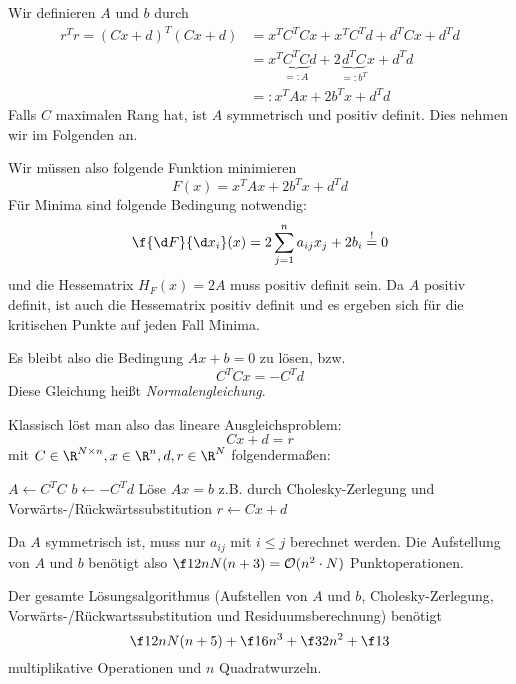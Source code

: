 \documentclass[a4paper]{scrartcl}
\numberwithin{equation}{section}
\begin{document}
Wir definieren $A$ und $b$ durch
\begin{align*}
	\label{eq:5.4}
	r^Tr = (Cx+d)^T(Cx+d) &= x^TC^TCx + x^TC^Td + d^TCx + d^Td \\
																					   &= x^T\underbrace{C^TC}_{=:A}d + 2\underbrace{d^TC}_{=:b^T}x + d^T d \\
						   &=: x^TAx + 2b^Tx +d^Td
\end{align*}
Falls $C$ maximalen Rang hat, ist $A$ symmetrisch und positiv definit.
Dies nehmen wir im Folgenden an.

Wir müssen also folgende Funktion minimieren
\begin{equation}
	\label{eq:5.5}
	F(x) = x^TAx + 2b^Tx + d^Td
\end{equation}
Für Minima sind folgende Bedingung notwendig:
\begin{equation}
	\label{eq:5.6}
	\f {\d F}{\d x_i}(x) = 2\sum_{j=1}^n a_{ij}x_j + 2b_i \stackrel != 0
\end{equation}
und die Hessematrix $H_F(x) = 2A$ muss positiv definit sein.
Da $A$ positiv definit, ist auch die Hessematrix positiv definit und es ergeben sich für die kritischen Punkte auf jeden Fall Minima.

Es bleibt also die Bedingung $Ax + b=0$ zu lösen, bzw.
\begin{equation}
	\label{eq:5.7}
	C^TCx = -C^Td
\end{equation}
Diese Gleichung heißt \emph{Normalengleichung}.

Klassisch löst man also das lineare Ausgleichsproblem:
\[
	Cx + d = r
\]
mit $C\in \R^{N\times n}, x\in \R^n, d,r\in \R^N$ folgendermaßen:

\begin{alg}
	\label{alg:5.1}
	
	\begin{algorithmic}
		\State $A \gets C^TC$
		\State $b \gets -C^Td$
		\State Löse $Ax=b$ z.B. durch Cholesky-Zerlegung und Vorwärts-/Rückwärtssubstitution
		\State $r \gets Cx+d$ 
	\end{algorithmic}

	Da $A$ symmetrisch ist, muss nur $a_{ij}$ mit $i\le j$ berechnet werden.
	Die Aufstellung von $A$ und $b$ benötigt also $\f12 nN(n+3) = \mathcal O(n^2\cdot N)$ Punktoperationen.
	
	Der gesamte Lösungsalgorithmus (Aufstellen von $A$ und $b$, Cholesky-Zerlegung, Vorwärts-/Rückwartssubstitution und Residuumsberechnung) benötigt
	\[
		\f 12 nN(n+5) +\f16 n^3 +\f32 n^2+\f13
	\]
	multiplikative Operationen und $n$ Quadratwurzeln.
\end{alg}
\end{document}

